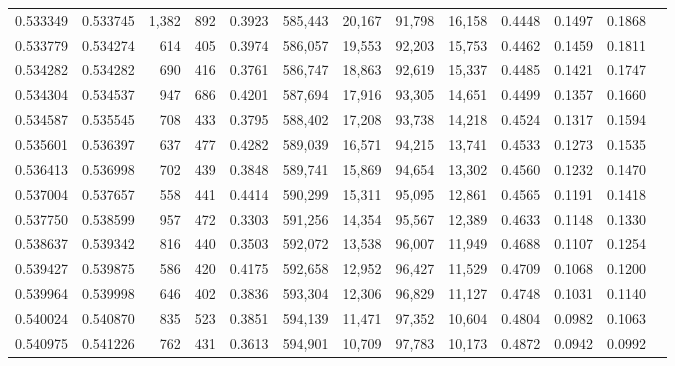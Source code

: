 \begin{tabular}{rrrrrrrrrrrrr}
0.533349 & 0.533745 &  1,382 &   892 &                                     0.3923 & 585,443 &  20,167 &  91,798 &  16,158 & 0.4448 & 0.1497 & 0.1868 \\
0.533779 & 0.534274 &    614 &   405 &                                     0.3974 & 586,057 &  19,553 &  92,203 &  15,753 & 0.4462 & 0.1459 & 0.1811 \\
0.534282 & 0.534282 &    690 &   416 &                                     0.3761 & 586,747 &  18,863 &  92,619 &  15,337 & 0.4485 & 0.1421 & 0.1747 \\
0.534304 & 0.534537 &    947 &   686 &                                     0.4201 & 587,694 &  17,916 &  93,305 &  14,651 & 0.4499 & 0.1357 & 0.1660 \\
0.534587 & 0.535545 &    708 &   433 &                                     0.3795 & 588,402 &  17,208 &  93,738 &  14,218 & 0.4524 & 0.1317 & 0.1594 \\
0.535601 & 0.536397 &    637 &   477 &                                     0.4282 & 589,039 &  16,571 &  94,215 &  13,741 & 0.4533 & 0.1273 & 0.1535 \\
0.536413 & 0.536998 &    702 &   439 &                                     0.3848 & 589,741 &  15,869 &  94,654 &  13,302 & 0.4560 & 0.1232 & 0.1470 \\
0.537004 & 0.537657 &    558 &   441 &                                     0.4414 & 590,299 &  15,311 &  95,095 &  12,861 & 0.4565 & 0.1191 & 0.1418 \\
0.537750 & 0.538599 &    957 &   472 &                                     0.3303 & 591,256 &  14,354 &  95,567 &  12,389 & 0.4633 & 0.1148 & 0.1330 \\
0.538637 & 0.539342 &    816 &   440 &                                     0.3503 & 592,072 &  13,538 &  96,007 &  11,949 & 0.4688 & 0.1107 & 0.1254 \\
0.539427 & 0.539875 &    586 &   420 &                                     0.4175 & 592,658 &  12,952 &  96,427 &  11,529 & 0.4709 & 0.1068 & 0.1200 \\
0.539964 & 0.539998 &    646 &   402 &                                     0.3836 & 593,304 &  12,306 &  96,829 &  11,127 & 0.4748 & 0.1031 & 0.1140 \\
0.540024 & 0.540870 &    835 &   523 &                                     0.3851 & 594,139 &  11,471 &  97,352 &  10,604 & 0.4804 & 0.0982 & 0.1063 \\
0.540975 & 0.541226 &    762 &   431 &                                     0.3613 & 594,901 &  10,709 &  97,783 &  10,173 & 0.4872 & 0.0942 & 0.0992 \\

\end{tabular}
